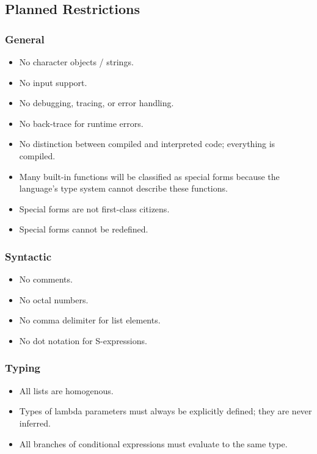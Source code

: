 \documentclass[a4paper, 12pt]{article}
\begin{document}
\subsection{Planned Restrictions}
\subsubsection{General}
\begin{itemize}
    \item No character objects / strings.
    \item No input support.
    \item No debugging, tracing, or error handling.
    \item No back-trace for runtime errors.
    \item No distinction between compiled and interpreted code; everything is compiled.
    \item Many built-in functions will be classified as special forms because the language's type system cannot describe these functions.
    \item Special forms are not first-class citizens.
    \item Special forms cannot be redefined.
\end{itemize}

\subsubsection{Syntactic}
\begin{itemize}
    \item No comments.
    \item No octal numbers.
    \item No comma delimiter for list elements.
    \item No dot notation for S-expressions.
\end{itemize}

\subsubsection{Typing}
\begin{itemize}
    \item All lists are homogenous.
    \item Types of lambda parameters must always be explicitly defined; they are never inferred.
    \item All branches of conditional expressions must evaluate to the same type.
\end{itemize}
\end{document}
